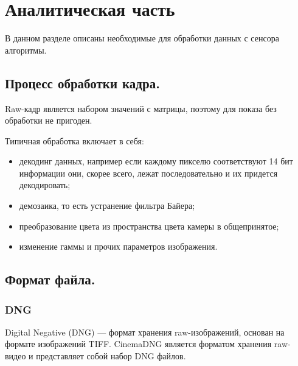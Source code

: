 \chapter{Аналитическая часть}

В данном разделе описаны необходимые для обработки данных с сенсора алгоритмы.

\section{Процесс обработки кадра.}

Raw-кадр является набором значений с матрицы, поэтому для показа без обработки не пригоден.

Типичная обработка включает в себя:
\begin{itemize}
	\item декодинг данных, например если каждому пикселю соответствуют 14 бит информации они, скорее всего, лежат последовательно и их придется декодировать;
	\item демозаика, то есть устранение фильтра Байера;
	\item преобразование цвета из пространства цвета камеры в общепринятое;
	\item изменение гаммы и прочих параметров изображения.
\end{itemize}


\section{Формат файла.}

\subsection{DNG}

Digital Negative (DNG) --- формат хранения raw-изображений, основан на формате изображений TIFF. CinemaDNG является форматом хранения raw-видео и представляет собой набор DNG файлов. 

